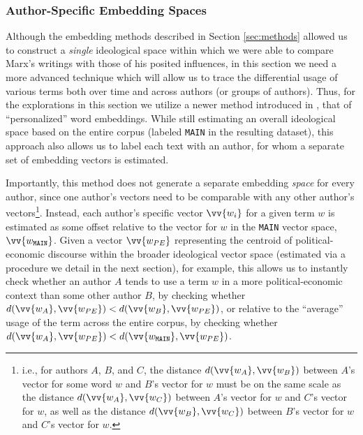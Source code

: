 \subsubsection{Author-Specific Embedding Spaces}

Although the embedding methods described in Section \ref{sec:methods} allowed us to construct a \textit{single} ideological space within which we were able to compare Marx's writings with those of his posited influences, in this section we need a more advanced technique which will allow us to trace the differential usage of various terms both over time and across authors (or groups of authors). Thus, for the explorations in this section we utilize a newer method introduced in
\cite{welch_exploring_2020}, %
that of ``personalized'' word embeddings. While still estimating an overall ideological space based on the entire corpus (labeled \texttt{MAIN} in the resulting dataset), this approach also allows us to label each text with an author, for whom a separate set of embedding vectors is estimated.

Importantly, this method does not generate a separate embedding \textit{space} for every author, since one author's vectors need to be comparable with any other author's vectors\footnote{i.e., for authors $A$, $B$, and $C$, the distance $d(\vv{w_A}, \vv{w_B})$ between $A$'s vector for some word $w$ and $B$'s vector for $w$ must be on the same scale as the distance $d(\vv{w_A}, \vv{w_C})$ between $A$'s vector for $w$ and $C$'s vector for $w$, as well as the distance $d(\vv{w_B}, \vv{w_C})$ between $B$'s vector for $w$ and $C$'s vector for $w$.}. Instead, each author's specific vector $\vv{w_i}$ for a given term $w$ is estimated as some offset relative to the vector for $w$ in the \texttt{MAIN} vector space, $\vv{w_\texttt{MAIN}}$. Given a vector $\vv{w_{PE}}$ representing the centroid of political-economic discourse within the broader ideological vector space (estimated via a procedure we detail in the next section), for example, this allows us to instantly check whether an author $A$ tends to use a term $w$ in a more political-economic context than some other author $B$, by checking whether $d(\vv{w_A},\vv{w_{PE}}) < d(\vv{w_B},\vv{w_{PE}})$, or relative to the ``average'' usage of the term across the entire corpus, by checking whether $d(\vv{w_A},\vv{w_{PE}}) < d(\vv{w_\texttt{MAIN}},\vv{w_{PE}})$.

